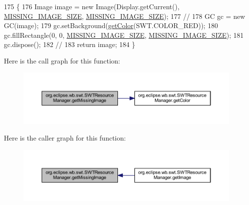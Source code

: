 \begin{DoxyCode}
175                                            \{
176         Image image = \textcolor{keyword}{new} Image(Display.getCurrent(), \hyperlink{classorg_1_1eclipse_1_1wb_1_1swt_1_1_s_w_t_resource_manager_af1e192f035fe5d70232cd33ca3810a4f}{MISSING\_IMAGE\_SIZE}, 
      \hyperlink{classorg_1_1eclipse_1_1wb_1_1swt_1_1_s_w_t_resource_manager_af1e192f035fe5d70232cd33ca3810a4f}{MISSING\_IMAGE\_SIZE});
177         \textcolor{comment}{//}
178         GC gc = \textcolor{keyword}{new} GC(image);
179         gc.setBackground(\hyperlink{classorg_1_1eclipse_1_1wb_1_1swt_1_1_s_w_t_resource_manager_a261745b44e6e7846bd9b98c6777600eb}{getColor}(SWT.COLOR\_RED));
180         gc.fillRectangle(0, 0, \hyperlink{classorg_1_1eclipse_1_1wb_1_1swt_1_1_s_w_t_resource_manager_af1e192f035fe5d70232cd33ca3810a4f}{MISSING\_IMAGE\_SIZE}, 
      \hyperlink{classorg_1_1eclipse_1_1wb_1_1swt_1_1_s_w_t_resource_manager_af1e192f035fe5d70232cd33ca3810a4f}{MISSING\_IMAGE\_SIZE});
181         gc.dispose();
182         \textcolor{comment}{//}
183         \textcolor{keywordflow}{return} image;
184     \}
\end{DoxyCode}


Here is the call graph for this function\-:
\nopagebreak
\begin{figure}[H]
\begin{center}
\leavevmode
\includegraphics[width=350pt]{classorg_1_1eclipse_1_1wb_1_1swt_1_1_s_w_t_resource_manager_a1ff45fd318d3ffda2bb99acbcf2153bc_cgraph}
\end{center}
\end{figure}




Here is the caller graph for this function\-:
\nopagebreak
\begin{figure}[H]
\begin{center}
\leavevmode
\includegraphics[width=350pt]{classorg_1_1eclipse_1_1wb_1_1swt_1_1_s_w_t_resource_manager_a1ff45fd318d3ffda2bb99acbcf2153bc_icgraph}
\end{center}
\end{figure}





